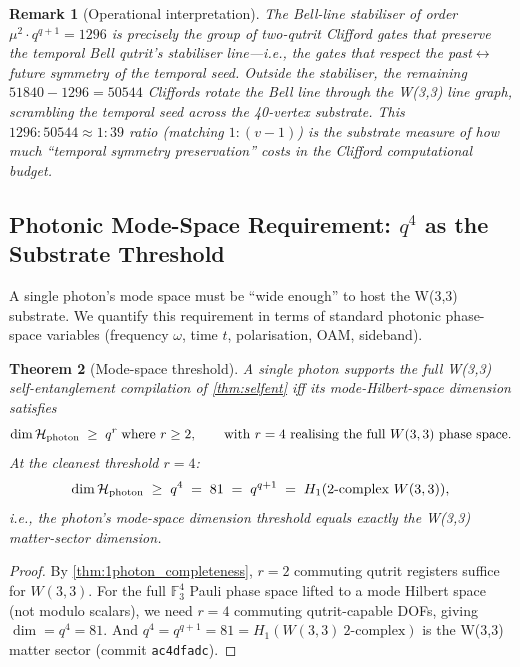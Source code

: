 ﻿\documentclass[12pt]{article}
\newtheorem{theorem}{Theorem}[section]
\newtheorem{remark}[theorem]{Remark}
\newcommand{\GF}[1]{\mathbb{F}_{#1}}
\begin{document}
\begin{remark}[Operational interpretation]
The Bell-line stabiliser of order $\mu^2 \cdot q^{q+1} = 1296$ is precisely
the group of two-qutrit Clifford gates that preserve the temporal Bell
qutrit's stabiliser line---i.e., the gates that respect the
\emph{past$\leftrightarrow$future symmetry} of the temporal seed.  Outside
the stabiliser, the remaining $51840 - 1296 = 50544$ Cliffords \emph{rotate
the Bell line through the W(3,3) line graph}, scrambling the temporal seed
across the 40-vertex substrate.  This $1296 : 50544 \approx 1 : 39$
ratio (matching $1 : (v-1)$) is the substrate measure of how much
``temporal symmetry preservation'' costs in the Clifford computational
budget.
\end{remark}

\subsection{Photonic Mode-Space Requirement: $q^4$ as the Substrate Threshold}
\label{sec:mode_space_req}

A single photon's mode space must be ``wide enough'' to host the W(3,3)
substrate.  We quantify this requirement in terms of standard photonic
phase-space variables (frequency $\omega$, time $t$, polarisation, OAM,
sideband).

\begin{theorem}[Mode-space threshold]\label{thm:mode_space}
A single photon supports the full W(3,3) self-entanglement compilation
of \cref{thm:selfent} \emph{iff} its mode-Hilbert-space dimension satisfies
\begin{equation}
  \dim \mathcal H_{\rm photon}  \;\ge\;  q^{r}
  \;\text{where }r \ge 2,
  \qquad
  \text{with }r = 4 \text{ realising the full }W(3,3)\text{ phase space.}
  \label{eq:mode_space_req}
\end{equation}
At the cleanest threshold $r = 4$:
\begin{equation}
  \dim \mathcal H_{\rm photon} \;\ge\; q^4 \;=\; 81 \;=\; q^{q+1}
  \;=\; H_1(2\text{-complex }W(3,3)),
\end{equation}
i.e., the photon's mode-space dimension threshold equals exactly the
W(3,3) matter-sector dimension.
\end{theorem}

\begin{proof}
By \cref{thm:1photon_completeness}, $r = 2$ commuting qutrit registers
suffice for $W(3,3)$.  For the full $\GF{3}^4$ Pauli phase space lifted to a
mode Hilbert space (not modulo scalars), we need $r = 4$ commuting
qutrit-capable DOFs, giving $\dim = q^4 = 81$.  And $q^4 = q^{q+1} = 81 =
H_1(W(3,3)\ 2\text{-complex})$ is the W(3,3) matter sector
(commit \texttt{ac4dfadc}).
\end{proof}
\end{document}
